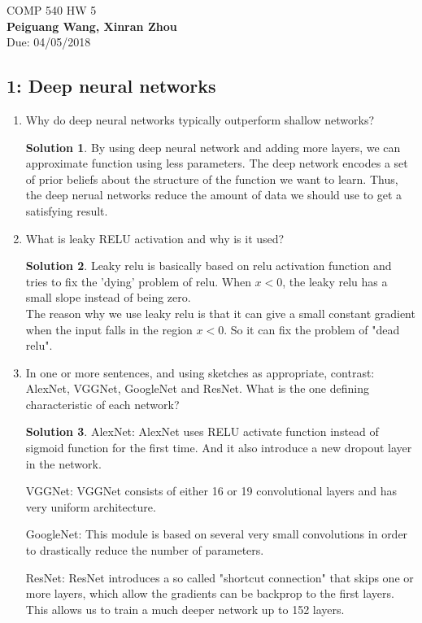 \documentclass[]{book}
\theoremstyle{definition}
\newtheorem*{soln}{Solution}
\begin{document}
\begin{center}
{\Large COMP 540 \hspace{0.5cm} HW 5}\\
\textbf{Peiguang Wang, Xinran Zhou}\\ %
Due: 04/05/2018 %
\end{center}

\vspace{0.2 cm}


\subsection*{1: Deep neural networks }
\begin{enumerate}
	\item Why do deep neural networks typically outperform shallow networks?
	\begin{soln}
		By using deep neural network and adding more layers, we can approximate function using less parameters.
		The deep network encodes a set of prior beliefs about the structure of the function we want to learn. Thus, the deep nerual networks reduce the amount of data we should use to get a satisfying result.
	\end{soln}
	\item What is leaky RELU activation and why is it used?
	\begin{soln}
		Leaky relu is basically based on relu activation function and tries to fix the 'dying' problem of relu. When $x<0$, the leaky relu has a small slope instead of being zero.\\
		The reason why we use leaky relu is that it can give a small constant gradient when the input falls in the region $x<0$. So it can fix the problem of "dead relu". 
	\end{soln}
	\item In one or more sentences, and using sketches as appropriate, contrast: AlexNet, VGGNet, GoogleNet and ResNet. What is the one defining characteristic of each network?
	\begin{soln}
		AlexNet: AlexNet uses RELU activate function instead of sigmoid function for the first time. And it also introduce a new dropout layer in the network.
		
		VGGNet: VGGNet consists of either 16 or 19 convolutional layers and has very uniform architecture.
		
		GoogleNet: This module is based on several very small convolutions in order to drastically reduce the number of parameters. 
		
		ResNet: ResNet introduces a so called "shortcut connection" that skips one or more layers, which allow the gradients can be backprop to the first layers. This allows us to train a much deeper network up to 152 layers.
	\end{soln}
	
\end{enumerate}
\end{document}
